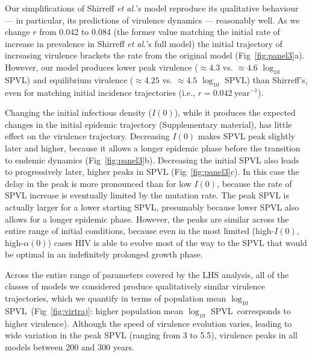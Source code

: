 \documentclass[10pt,letterpaper]{article}
\renewcommand{\figurename}{Fig}
\newcommand{\Lspvl}{$\log_{10}$ SPVL}
\newcommand{\etal}{\textit{et al.}}
\begin{document}
Our simplifications of Shirreff \etal's model \cite{shirreff_transmission_2011} reproduce its qualitative behaviour --- in particular, its predictions of virulence dynamics --- reasonably well. As we change $r$ from 0.042 to 0.084 (the former value matching the initial rate of increase in prevalence in Shirreff \etal's full model) the initial trajectory of increasing virulence brackets the rate from the original model (\figurename~\ref{fig:panel3}a). However, our model produces lower peak virulence ($\approx 4.3$ vs. $\approx 4.6$ \Lspvl) 
and equilibrium virulence ($\approx 4.25$ vs. $\approx 4.5$ \Lspvl) than Shirreff's, even for matching initial incidence trajectories (i.e., $r=0.042~\textrm{year}^{-1}$).

Changing the initial infectious density ($I(0)$), while it produces the expected changes in the initial epidemic trajectory (Supplementary material), has little effect on the virulence trajectory. Decreasing $I(0)$ makes SPVL peak slightly later and higher, because it allows a longer epidemic phase before the transition to endemic dynamics (\figurename~\ref{fig:panel3}b). Decreasing the initial SPVL also leads to progressively later, higher peaks in SPVL (\figurename~\ref{fig:panel3}c). In this case the delay in the peak is more pronounced than for low $I(0)$, because the rate of SPVL increase is eventually limited by the mutation rate. The peak SPVL is actually larger for a lower starting SPVL, presumably because lower SPVL also allows for a longer epidemic phase. However, the peaks are similar across the entire range of initial conditions, because even in the most limited (high-$I(0)$, high-$\alpha(0)$) cases HIV is able to evolve most of the way to the SPVL that would be optimal in an indefinitely prolonged growth phase.

Across the entire range of parameters covered by the LHS analysis, all of the classes of models we considered produce qualitatively similar virulence trajectories, which we quantify in terms of population mean \Lspvl\ (\figurename~\ref{fig:virtraj}: higher population mean \Lspvl\ corresponds
to higher virulence). Although the speed of virulence evolution varies, leading to wide variation in the peak SPVL (ranging from 3 to 5.5), virulence peaks in all models between 200 and 300 years.
\end{document}
